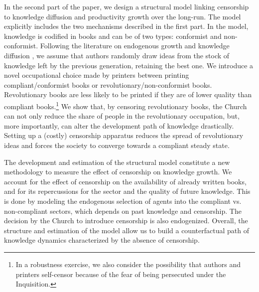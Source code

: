 In the second part of the paper, we design a structural model linking censorship to knowledge diffusion and productivity growth over the long-run. The model explicitly includes the two mechanisms described in the first part. In the model, knowledge is codified in books and can be of two types: conformist and non-conformist. Following the literature on endogenous growth and knowledge diffusion \cite{kremer1993population,jones2001industrial,lucas2009,lucas2014,de2017clans}, we assume that authors randomly draw ideas from the stock of knowledge left by the previous generation, retaining the best one. We introduce a novel occupational choice made by printers between printing compliant/conformist books or revolutionary/non-conformist books. Revolutionary books are less likely to be printed if they are of lower quality than compliant books.\footnote{In a robustness exercise, we also consider the possibility that authors and printers self-censor because of the fear of being persecuted under the Inquisition.} We show that, by censoring revolutionary books, the Church can not only reduce the share of people in the revolutionary occupation, but, more importantly, can alter the development path of knowledge drastically. Setting up a (costly) censorship apparatus  reduces the spread of revolutionary ideas and forces the society to converge towards a compliant steady state.

The development and estimation of the structural model constitute a new methodology to measure the effect of censorship on knowledge growth. We account for the effect of censorship on the availability of already written books, and for its repercussions for the sector and the quality of future knowledge. This is done by modeling the endogenous selection of agents into the compliant vs. non-compliant sectors, which depends on past knowledge and censorship. The decision by the Church to introduce censorship is also endogenized. Overall, the structure and estimation of the model allow us to build a counterfactual path of knowledge dynamics characterized by the absence of censorship.

